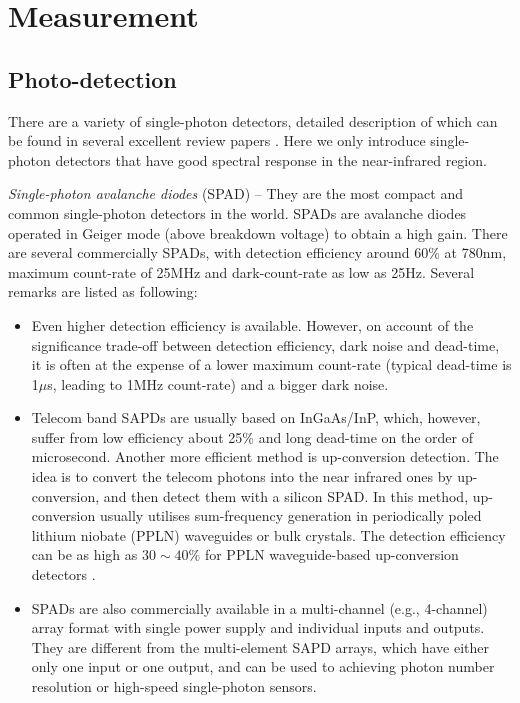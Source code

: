 %
%

\section{Measurement} 

%
%

\subsection{Photo-detection} 

There are a variety of single-photon detectors, detailed description of which can be found in several excellent review papers \cite{bib:eisaman2011, bib:hadfield2009}. Here we only introduce single-photon detectors that have good spectral response in the near-infrared region.

\textit{Single-photon avalanche diodes} (SPAD) -- They are the most compact and common single-photon detectors in the world. SPADs are avalanche diodes operated in Geiger mode (above breakdown voltage) to obtain a high gain. There are several commercially SPADs, with detection efficiency around 60\% at 780nm, maximum count-rate of 25MHz and dark-count-rate as low as 25Hz. Several remarks are listed as following:

\begin{itemize}
    \item Even higher detection efficiency is available. However, on account of the significance trade-off between detection efficiency, dark noise and dead-time, it is often at the expense of a lower maximum count-rate (typical dead-time is 1$\mu$s, leading to 1MHz count-rate) and a bigger dark noise.

    \item Telecom band SAPDs are usually based on InGaAs/InP, which, however, suffer from low efficiency about 25\% and long dead-time on the order of microsecond. Another more efficient method is up-conversion detection. The idea is to convert the telecom photons into the near infrared ones by up-conversion, and then detect them with a silicon SPAD. In this method, up-conversion usually utilises sum-frequency generation in periodically poled lithium niobate (PPLN) waveguides or bulk crystals. The detection efficiency can be as high as \mbox{$30\sim 40\%$} for PPLN waveguide-based up-conversion detectors \cite{bib:shentu2013ultralow}.
    \item SPADs are also commercially available in a multi-channel (e.g., 4-channel) array format with single power supply and individual inputs and outputs. They are different from the multi-element SAPD arrays, which have either only one input or one output, and can be used to achieving photon number resolution or high-speed single-photon sensors.
\end{itemize}


